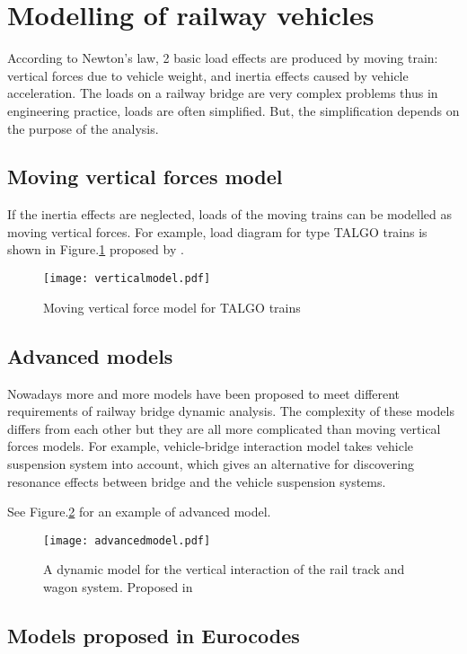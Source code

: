 \section{Modelling of railway vehicles}
According to Newton's law, 2 basic load effects are produced by moving train: vertical forces due to vehicle weight, and inertia effects caused by vehicle acceleration. The loads on a railway bridge are very complex problems thus in engineering practice, loads are often simplified. But, the simplification depends on the purpose of the analysis. 

\subsection{Moving vertical forces model}
If the inertia effects are neglected, loads of the moving trains can be modelled as moving vertical forces. For example, load diagram for type TALGO trains is shown in Figure.\ref{fig:verticalmodel} proposed by \cite{uic}.

\begin{figure}[h]
	\centering
	\texttt{[image: verticalmodel.pdf]}
	\caption{Moving vertical force model for TALGO trains}
	\label{fig:verticalmodel}
\end{figure}

\subsection{Advanced models}
Nowadays more and more models have been proposed to meet different requirements of railway bridge dynamic analysis. The complexity of these models differs from each other but they are all more complicated than moving vertical forces models. For example, vehicle-bridge interaction model takes vehicle suspension system into account, which gives an alternative for discovering resonance effects between bridge and the vehicle suspension systems. 

See Figure.\ref{fig:advancedmodel} for an example of advanced model.

\begin{figure}[p]
	\centering
	\texttt{[image: advancedmodel.pdf]}
	\caption{A dynamic model for the vertical interaction of the rail track and wagon system. Proposed in \cite{sun2002dynamic}}
	\label{fig:advancedmodel}
\end{figure}


\subsection{Models proposed in Eurocodes}

